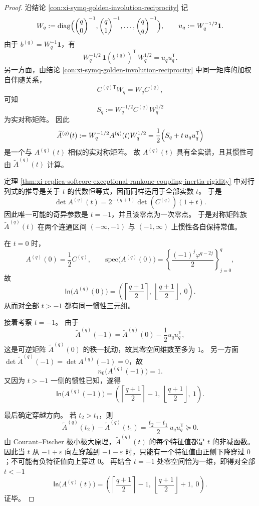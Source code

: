 \begin{proof}
沿结论 \ref{con:xi-symq-golden-involution-reciprocity} 记
\[
W_q:=\mathrm{diag}\Bigl(\binom{q}{0}^{-1},\binom{q}{1}^{-1},\dots,\binom{q}{q}^{-1}\Bigr),
\qquad
u_q:=W_q^{-1/2}\mathbf 1.
\]
由于 \(b^{(q)}=W_q^{-1}\mathbf 1\)，有
\[
W_q^{-1/2}\,\mathbf 1(b^{(q)})^{\mathsf T}\,W_q^{1/2}
=
u_qu_q^{\mathsf T}.
\]
另一方面，由结论 \ref{con:xi-symq-golden-involution-reciprocity} 中同一矩阵的加权自伴随关系，
\[
C^{(q)\mathsf T}W_q=W_qC^{(q)},
\]
可知
\[
S_q:=W_q^{-1/2}C^{(q)}W_q^{1/2}
\]
为实对称矩阵。
因此
\[
\widetilde A^{(q)}(t)
:=
W_q^{-1/2}A^{(q)}(t)W_q^{1/2}
=
\frac12\Bigl(S_q+t\,u_qu_q^{\mathsf T}\Bigr)
\]
是一个与 \(A^{(q)}(t)\) 相似的实对称矩阵。
故 \(A^{(q)}(t)\) 具有全实谱，且其惯性可由 \(\widetilde A^{(q)}(t)\) 计算。

定理 \ref{thm:xi-replica-softcore-exceptional-rankone-coupling-inertia-rigidity} 中对行列式的推导是关于 \(t\) 的代数恒等式，因而同样适用于全部实数 \(t\)。
于是
\[
\det A^{(q)}(t)=2^{-(q+1)}\det(C^{(q)})(1+t).
\]
因此唯一可能的奇异参数是 \(t=-1\)，并且该零点为一次零点。
于是对称矩阵族 \(\widetilde A^{(q)}(t)\) 在两个连通区间 \((-\infty,-1)\) 与 \((-1,\infty)\) 上惯性各自保持常值。

在 \(t=0\) 时，
\[
A^{(q)}(0)=\frac12C^{(q)},
\qquad
\mathrm{spec}\bigl(A^{(q)}(0)\bigr)
=
\left\{\frac{(-1)^j\varphi^{q-2j}}{2}\right\}_{j=0}^{q},
\]
故
\[
\mathsf{In}\bigl(A^{(q)}(0)\bigr)
=
\left(\left\lceil\frac{q+1}{2}\right\rceil,\ \left\lfloor\frac{q+1}{2}\right\rfloor,\ 0\right).
\]
从而对全部 \(t>-1\) 都有同一惯性三元组。

接着考察 \(t=-1\)。
由于
\[
\widetilde A^{(q)}(-1)
=
\widetilde A^{(q)}(0)-\frac12u_qu_q^{\mathsf T},
\]
这是可逆矩阵 \(\widetilde A^{(q)}(0)\) 的秩一扰动，故其零空间维数至多为 \(1\)。
另一方面 \(\det \widetilde A^{(q)}(-1)=\det A^{(q)}(-1)=0\)，故
\[
n_0\bigl(A^{(q)}(-1)\bigr)=1.
\]
又因为 \(t>-1\) 一侧的惯性已知，遂得
\[
\mathsf{In}\bigl(A^{(q)}(-1)\bigr)
=
\left(\left\lceil\frac{q+1}{2}\right\rceil-1,\ \left\lfloor\frac{q+1}{2}\right\rfloor,\ 1\right).
\]

最后确定穿越方向。
若 \(t_2>t_1\)，则
\[
\widetilde A^{(q)}(t_2)-\widetilde A^{(q)}(t_1)
=
\frac{t_2-t_1}{2}\,u_qu_q^{\mathsf T}\succeq 0.
\]
由 Courant--Fischer 极小极大原理，\(\widetilde A^{(q)}(t)\) 的每个特征值都是 \(t\) 的非减函数。
因此当 \(t\) 从 \(-1+\varepsilon\) 向左穿越到 \(-1-\varepsilon\) 时，只能有一个特征值由正侧下降穿过 \(0\)；不可能有负特征值向上穿过 \(0\)。
再结合 \(t=-1\) 处零空间恰为一维，即得对全部 \(t<-1\)
\[
\mathsf{In}\bigl(A^{(q)}(t)\bigr)
=
\left(\left\lceil\frac{q+1}{2}\right\rceil-1,\ \left\lfloor\frac{q+1}{2}\right\rfloor+1,\ 0\right).
\]
证毕。
\end{proof}
